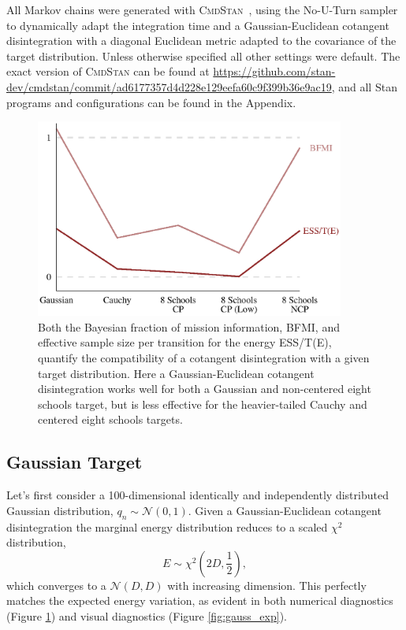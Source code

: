 \documentclass[stslayout]{imsart}
\begin{document}
All Markov chains were generated with \textsc{CmdStan}~\citep{CmdStan:2016}, 
using the No-U-Turn sampler~\citep{HoffmanEtAl:2014} to dynamically 
adapt the integration time and a Gaussian-Euclidean cotangent disintegration 
with a diagonal Euclidean metric adapted to the covariance of the target 
distribution.  Unless otherwise specified all other settings were default.  
The exact version of \textsc{CmdStan} can be found at 
\url{https://github.com/stan-dev/cmdstan/commit/ad6177357d4d228e129eefa60c9f399b36e9ac19}, and all Stan programs 
and configurations can be found in the Appendix.

\begin{figure}
\centering
\includegraphics[width=4in]{experiment_results.eps}
\caption{Both the Bayesian fraction of mission information, BFMI, 
and effective sample size per transition for the energy ESS/T(E),
quantify the compatibility of a cotangent disintegration with a
given target distribution.  Here a Gaussian-Euclidean cotangent
disintegration works well for both a Gaussian and non-centered eight
schools target, but is less effective for the heavier-tailed Cauchy
and centered eight schools targets.}
\label{fig:num_diagnostics}
\end{figure}

\subsection{Gaussian Target}

Let's first consider a 100-dimensional identically and independently distributed
Gaussian distribution, $q_{n} \sim \mathcal{N} \! \left( 0, 1 \right)$.  Given a
Gaussian-Euclidean cotangent disintegration the marginal energy distribution
reduces to a scaled $\chi^{2}$ distribution, 
%
\begin{equation*}
E \sim \chi^{2} \! \left( 2 D, \frac{1}{2} \right),
\end{equation*}
%
which converges to a $\mathcal{N} \! \left( D, D \right)$ with increasing
dimension.  This perfectly matches the expected energy variation, as evident
in both numerical diagnostics (Figure \ref{fig:num_diagnostics})  and visual
diagnostics (Figure \ref{fig:gauss_exp}).
\end{document}
